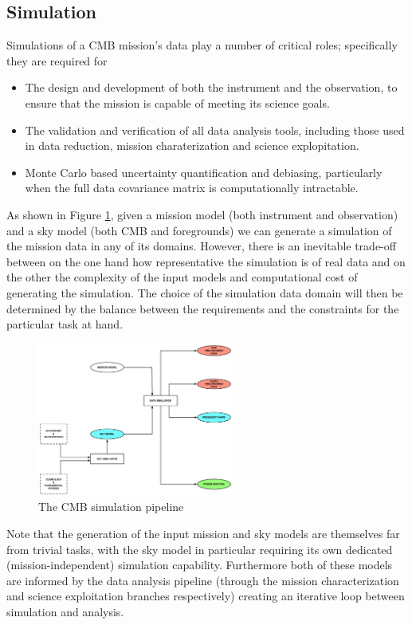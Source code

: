 \subsection{Simulation}

Simulations of a CMB mission's data play a number of critical roles; specifically they are required for
\begin{itemize}
\item The design and development of both the instrument and the observation, to ensure that the mission is capable of meeting its science goals.
\item The validation and verification of all data analysis tools, including those used in data reduction, mission charaterization and science explopitation.
\item Monte Carlo based uncertainty quantification and debiasing, particularly when the full data covariance matrix is computationally intractable.
\end{itemize}

As shown in Figure \ref{fig_sim}, given a mission model (both instrument and observation) and a sky model (both CMB and foregrounds) we can generate a simulation of the mission data in any of its domains. However, there is an inevitable trade-off between on the one hand how representative the simulation is of real data and on the other the complexity of the input models and computational cost of generating the simulation. The choice of the simulation data domain will then be determined by the balance between the requirements and the constraints for the particular task at hand.

\begin{figure}[htbp]
\includegraphics[width=0.575\textwidth]{Analysis/sim}
\caption{The CMB simulation pipeline}
\label{fig_sim}
\end{figure}

Note that the generation of the input mission and sky models are themselves far from trivial tasks, with the sky model in particular requiring its own dedicated (mission-independent) simulation capability. Furthermore both of these models are informed by the data analysis pipeline (through the mission characterization and science exploitation branches respectively) creating an iterative loop between simulation and analysis.

